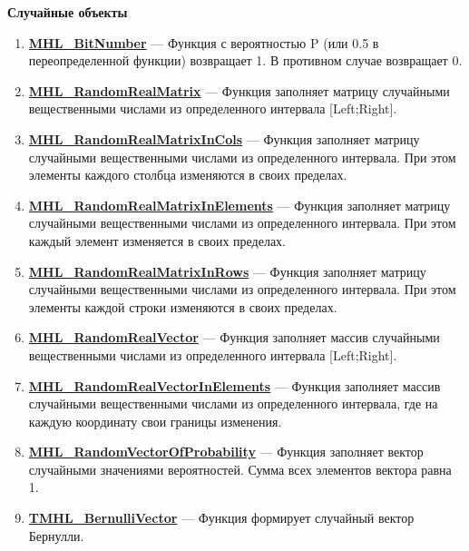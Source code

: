 \documentclass[a4paper,12pt]{article}
\begin{document}
\textbf{Случайные объекты}
\begin{enumerate}

\item \textbf{\hyperref[MHL_BitNumber]{MHL\_BitNumber}} --- Функция с вероятностью P (или 0.5 в переопределенной функции) возвращает 1. В противном случае возвращает 0.

\item \textbf{\hyperref[MHL_RandomRealMatrix]{MHL\_RandomRealMatrix}} --- Функция заполняет матрицу случайными вещественными числами из определенного интервала [Left;Right].

\item \textbf{\hyperref[MHL_RandomRealMatrixInCols]{MHL\_RandomRealMatrixInCols}} --- Функция заполняет матрицу случайными вещественными числами из определенного интервала. При этом элементы каждого столбца изменяются в своих пределах.

\item \textbf{\hyperref[MHL_RandomRealMatrixInElements]{MHL\_RandomRealMatrixInElements}} --- Функция заполняет матрицу случайными вещественными числами из определенного интервала. При этом каждый элемент изменяется в своих пределах.

\item \textbf{\hyperref[MHL_RandomRealMatrixInRows]{MHL\_RandomRealMatrixInRows}} --- Функция заполняет матрицу случайными вещественными числами из определенного интервала. При этом элементы каждой строки изменяются в своих пределах.

\item \textbf{\hyperref[MHL_RandomRealVector]{MHL\_RandomRealVector}} --- Функция заполняет массив случайными вещественными числами из определенного интервала [Left;Right].

\item \textbf{\hyperref[MHL_RandomRealVectorInElements]{MHL\_RandomRealVectorInElements}} --- Функция заполняет массив случайными вещественными числами из определенного интервала, где на каждую координату свои границы изменения.

\item \textbf{\hyperref[MHL_RandomVectorOfProbability]{MHL\_RandomVectorOfProbability}} --- Функция заполняет вектор случайными значениями вероятностей. Сумма всех элементов вектора равна 1.

\item \textbf{\hyperref[TMHL_BernulliVector]{TMHL\_BernulliVector}} --- Функция формирует случайный вектор Бернулли.


\end{enumerate}
\end{document}

